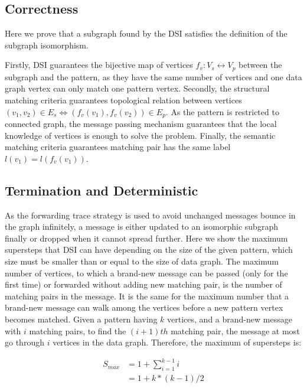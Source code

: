 \subsection{Correctness}

Here we prove that a subgraph found by the DSI satisfies the definition of the subgraph isomorphism.
 
Firstly, DSI guarantees the bijective map of vertices $f_v:V_s \leftrightarrow V_p$ between the subgraph and the pattern, as they have the same number of vertices and one data graph vertex can only match one pattern vertex. Secondly, the structural matching criteria guarantees topological relation between vertices $(v_1, v_2) \in E_s \iff (f_v(v_1), f_v(v_2)) \in E_p$. As the pattern is restricted to connected graph, the message passing mechanism guarantees that the local knowledge of vertices is enough to solve the problem. Finally, the semantic matching criteria guarantees matching pair has the same label $l(v_1) = l(f_v(v_1))$. 

\subsection{Termination and Deterministic}

As the forwarding trace strategy is used to avoid unchanged messages bounce in the graph infinitely, a message is either updated to an isomorphic subgraph finally or dropped when it cannot spread further. Here we show the maximum supersteps that DSI can have depending on the size of the given pattern, which size must be smaller than or equal to the size of data graph. The maximum number of vertices, to which a brand-new message can be passed (only for the first time) or forwarded without adding new matching pair, is the number of matching pairs in the message. It is the same for the maximum number that a brand-new message can walk among the vertices before a new pattern vertex becomes matched. Given a pattern having $k$ vertices, and a brand-new message with $i$ matching pairs, to find the $(i+1)th$ matching pair, the message at most go through $i$ vertices in the data graph. Therefore, the maximum of supersteps is:

\begin{equation}\label{eq:DSIComplexityMaxIteration}
\begin{split}
	S_{max} &= 1 + \sum_{i=1}^{k-1} i\\
			&= 1 + k*(k-1)/2\\
\end{split}
\end{equation}

